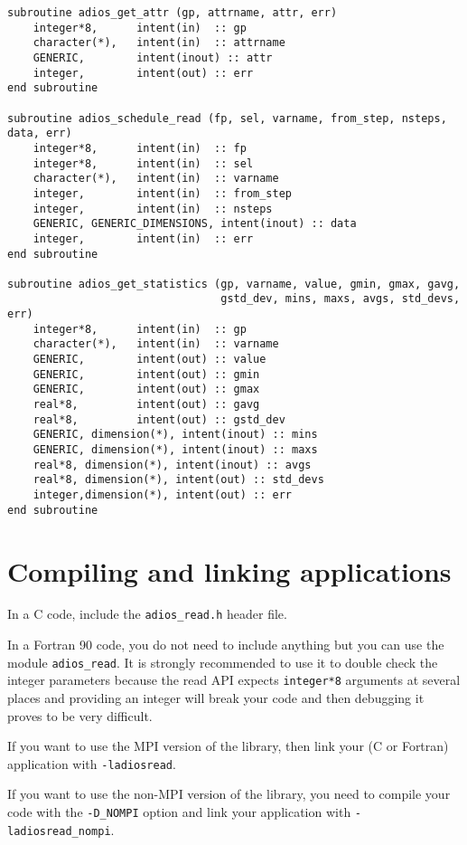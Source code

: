 \begin{lstlisting}[language=ADIOS,alsolanguage=Fortran]
subroutine adios_get_attr (gp, attrname, attr, err)
    integer*8,      intent(in)  :: gp
    character(*),   intent(in)  :: attrname
    GENERIC,        intent(inout) :: attr
    integer,        intent(out) :: err
end subroutine

subroutine adios_schedule_read (fp, sel, varname, from_step, nsteps, data, err)
    integer*8,      intent(in)  :: fp
    integer*8,      intent(in)  :: sel
    character(*),   intent(in)  :: varname
    integer,        intent(in)  :: from_step
    integer,        intent(in)  :: nsteps
    GENERIC, GENERIC_DIMENSIONS, intent(inout) :: data
    integer,        intent(in)  :: err
end subroutine

subroutine adios_get_statistics (gp, varname, value, gmin, gmax, gavg, 
                                 gstd_dev, mins, maxs, avgs, std_devs, err)
    integer*8,      intent(in)  :: gp
    character(*),   intent(in)  :: varname
    GENERIC,        intent(out) :: value
    GENERIC,        intent(out) :: gmin
    GENERIC,        intent(out) :: gmax
    real*8,         intent(out) :: gavg
    real*8,         intent(out) :: gstd_dev
    GENERIC, dimension(*), intent(inout) :: mins
    GENERIC, dimension(*), intent(inout) :: maxs
    real*8, dimension(*), intent(inout) :: avgs
    real*8, dimension(*), intent(out) :: std_devs
    integer,dimension(*), intent(out) :: err
end subroutine
\end{lstlisting}

\section{Compiling and linking applications}

In a C code, include the \verb+adios_read.h+ header file. 

In a Fortran 90 code, you do not need to include anything but you can use the module 
\verb+adios_read+. It is strongly recommended to use it to double check the integer 
parameters because the read API expects \verb+integer*8+ arguments 
at several places and providing an integer will break your code and then debugging 
it proves to be very difficult.

If you want to use the MPI version of the library, then link your (C or Fortran) 
application with \verb+-ladiosread+.

If you want to use the non-MPI version of the library, you need to compile your 
code with the \verb+-D_NOMPI+ option and link your application with \verb+-ladiosread_nompi+.

